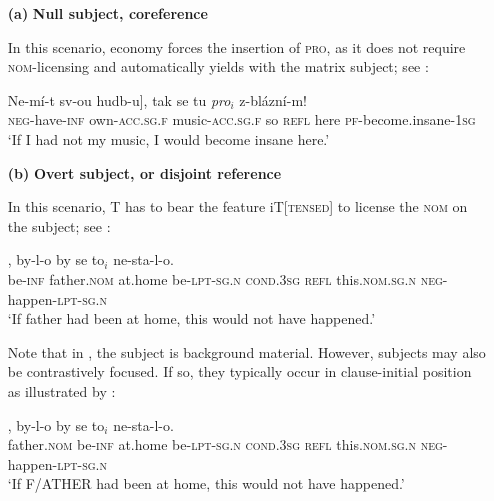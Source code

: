 \documentclass[output=paper,colorlinks,citecolor=brown,newtxmath]{langsci/langscibook}
\begin{document}
\begin{itemize}
\item[\textbf{(a)}] \textbf{Null subject, coreference}

In this scenario,  economy forces the insertion of \textsc{pro}, as it does not require \textsc{nom}-licensing and automatically yields  with the matrix subject; see :

\ea\label{ex:music3}
\gll {[\textsc{pro}$_i$} Ne-mí-t sv-ou hudb-u], tak se tu {\textit{pro}$_i$} z-blázní-m!\\
     {} \textsc{neg}-have-\textsc{inf} own-\textsc{acc.sg.f} music-\textsc{acc.sg.f} so \textsc{refl} here {} \textsc{pf}-{become.insane}-\textsc{1sg}\\
\glt `If I had not my music, I would become insane here.'
\z


\item[\textbf{(b)}] \textbf{Overt subject,  or disjoint reference}

In this scenario, T has to bear the feature iT[\textsc{tensed}] to license the \textsc{nom} on the subject; see :

\ea\label{ex:father3}
, by-l-o by se to$_i$ ne-sta-l-o.\\
     {} be-\textsc{inf} father.\textsc{nom} {at.home} be-\textsc{lpt-sg.n} \textsc{cond.3sg} \textsc{refl} this.\textsc{nom.sg.n} \textsc{neg}-happen-\textsc{lpt-sg.n}\\
\glt `If father had been at home, this would not have happened.'
\z

\noindent Note that in , the subject is background material. However, subjects may also be contrastively focused. If so, they typically occur in clause-initial position as illustrated by :

\ea\label{ex:father4}
, by-l-o by se to$_i$ ne-sta-l-o.\\
     {} father.\textsc{nom} be-\textsc{inf} {at.home} be-\textsc{lpt-sg.n} \textsc{cond.3sg} \textsc{refl} this.\textsc{nom.sg.n} \textsc{neg}-happen-\textsc{lpt-sg.n}\\
\glt `If F/ATHER had been at home, this would not have happened.'
\z


\end{itemize}
\end{document}
